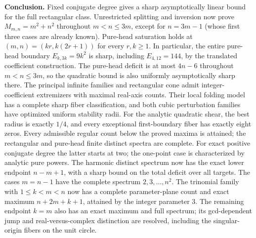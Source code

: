 \documentclass[UTF8,11pt]{ctexart}
\theoremstyle{definition}
\numberwithin{equation}{section}
\begin{document}
\begin{tcolorbox}[breakable,colback=MidnightBlue!4,colframe=MidnightBlue!50,sharp corners,boxrule=.5pt]
\textbf{Conclusion.} Fixed conjugate degree gives a sharp asymptotically
linear bound for the full rectangular class. Unrestricted splitting
and inversion now prove $M_{m,n}=m^2+n^2$ throughout
$m<n\le3m$, except for $n=3m-1$ (whose first three cases are
already known). Pure-head saturation holds at
$(m,n)=(kr,k(2r+1))$ for every $r,k\ge1$. In particular,
the entire pure-head boundary $E_{k,3k}=9k^2$ is sharp, including
$E_{4,12}=144$, by the translated coefficient construction.
The pure-head deficit is at most $4n-6$ throughout $m<n\le3m$,
so the quadratic bound is also uniformly asymptotically sharp there.
The principal infinite families and rectangular cone admit
integer-coefficient extremizers with maximal real-axis counts.
Their local folding model has a complete sharp fiber classification,
and both cubic perturbation families have optimized uniform stability
radii. For the analytic quadratic shear, the best radius is exactly
$1/4$, and every exceptional first-boundary fiber has exactly eight zeros.
Every admissible regular count below the proved maxima is attained;
the rectangular and pure-head finite distinct spectra are complete.
For exact positive conjugate degree the latter starts at two;
the one-point case is characterized by analytic pure powers.
The harmonic distinct spectrum now has the exact lower endpoint $n-m+1$,
with a sharp bound on the total deficit over all targets. The cases
$m=n-1$ have the complete spectrum $2,3,\ldots,n^2$.
The trinomial family with $1\le k<m<n$ now has a complete
parameter-plane count and exact maximum $n+2m+k+1$, attained by
the integer parameter $3$.
The remaining endpoint $k=m$ also has an exact maximum and full
spectrum; its gcd-dependent jump and real-versus-complex distinction
are resolved, including the singular-origin fibers on the unit circle.


\end{tcolorbox}
\end{document}
